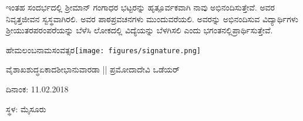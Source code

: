 {ಇಂತಹ ಸಂದರ್ಭದಲ್ಲಿ ಶ್ರೀಮಾನ್ ಗಂಗಾಧರ ಭಟ್ಟರನ್ನು ಹೃತ್ಪೂರ್ವಕವಾಗಿ ನಾವು ಅಭಿನಂದಿಸುತ್ತೇವೆ. ಅವರ ನಿವೃತ್ತಜೀವನ ಸ್ವಸ್ಥವಾಗಿರಲಿ. ಅವರ ಪಾಠಪ್ರವಚನಗಳು ಮುಂದುವರೆಯಲಿ. ಅವರನ್ನು ಅಭಿನಂದಿಸುವ ವಿದ್ಯಾರ್ಥಿಗಳು ಶ್ರೀಯುತರ\break ಪರಂಪರೆಯನ್ನು ಬೆಳೆಸಿ ಲೋಕದಲ್ಲಿ ವಿದ್ಯೆಯನ್ನು ಬೆಳಗಿಸಲಿ ಎಂದು ಭಗಂತನಲ್ಲಿ\break ಪ್ರಾರ್ಥಿಸುತ್ತೇವೆ.

\bigskip

\bigskip

\bigskip

\noindent
ಹೇಮಲಂಬನಾಮಸಂವತ್ಸರ\hfill\texttt{[image: figures/signature.png]}

\noindent
ವೈಶಾಖ\enginline{-}ಶುದ್ಧ\enginline{-}ಏಕಾದಶೀ\enginline{-}ಭಾನುವಾರ\hfill ಡಾ || ಪ್ರಮೋದಾದೇವಿ ಒಡೆಯರ್

\noindent
ದಿನಾಂಕ: 11.02.2018							

\noindent
ಸ್ಥಳ: ಮೈಸೂರು
}
